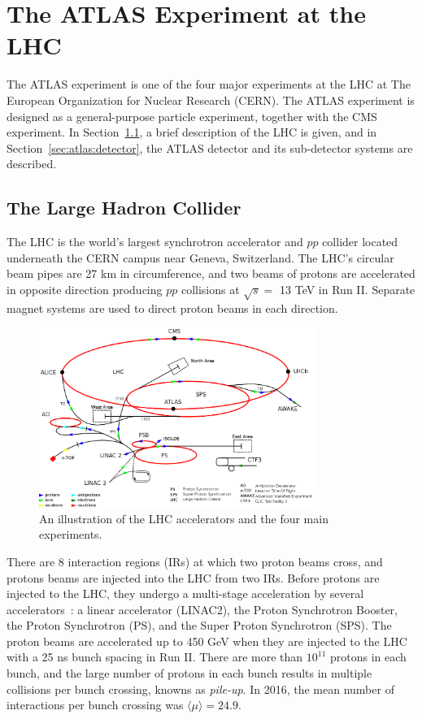 \chapter{The ATLAS Experiment at the LHC}
\label{chap:atlas_experiment}
The ATLAS experiment is one of the four major experiments at the LHC at The European Organization for Nuclear Research (CERN). The ATLAS experiment is designed as a general-purpose particle experiment, together with the CMS experiment. In Section~\ref{sec:atlas:lhc}, a brief description of the LHC is given, and in Section~\ref{sec:atlas:detector}, the ATLAS detector and its sub-detector systems are described.

\section{The Large Hadron Collider}
\label{sec:atlas:lhc}

The LHC is the world's largest synchrotron accelerator and $pp$ collider located underneath the CERN campus near Geneva, Switzerland. The LHC's circular beam pipes are 27 km in circumference, and two beams of protons are accelerated in opposite direction producing $pp$ collisions at $\sqrt{s} = $ 13 TeV in Run II. Separate magnet systems are used to direct proton beams in each direction.

\begin{figure}[!htb]
    \includegraphics[width=0.8\textwidth]{figs/lhc.png}
    \centering
    \caption{An illustration of the LHC accelerators and the four main experiments.}
    \label{fig:lhc}
\end{figure}

There are 8 interaction regions (IRs) at which two proton beams cross, and protons beams are injected into the LHC from two IRs. Before protons are injected to the LHC, they undergo a multi-stage acceleration by several accelerators~\cite{Bruning:782076}: a linear accelerator (LINAC2), the Proton Synchrotron Booster, the Proton Synchrotron (PS), and the Super Proton Synchrotron (SPS). The proton beams are accelerated up to 450 GeV when they are injected to the LHC with a 25 ns bunch spacing in Run II. There are more than $10^{11}$ protons in each bunch, and the large number of protons in each bunch results in multiple collisions per bunch crossing, knowns as \textit{pile-up}. In 2016, the mean number of interactions per bunch crossing was $\langle\mu\rangle = 24.9$.

